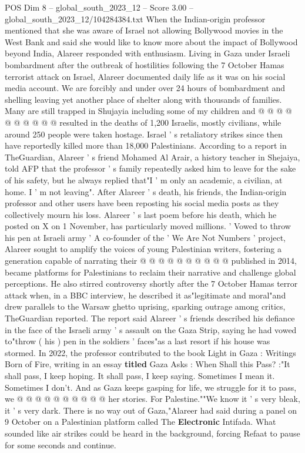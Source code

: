 \begin{textsample}{POS Dim 8 – global\_south\_2023\_12 – Score 3.00 – global\_south\_2023\_12/104284384.txt}
When the Indian-origin professor mentioned that she was aware of Israel not allowing Bollywood movies in the West Bank and said she would like to know more about the impact of Bollywood beyond India, Alareer responded with enthusiasm.
Living in Gaza under Israeli bombardment after the outbreak of hostilities following the 7 October Hamas terrorist attack on Israel, Alareer documented daily life as it was on his social media account.
We are forcibly and under over 24 hours of bombardment and shelling leaving yet another place of shelter along with thousands of families.
Many are still trapped in Shujayia including some of my children and @ @ @ @ @ @ @ @ @ @ resulted in the deaths of 1,200 Israelis, mostly civilians, while around 250 people were taken hostage.
Israel ' s retaliatory strikes since then have reportedly killed more than 18,000 Palestinians.
According to a report in TheGuardian, Alareer ' s friend Mohamed Al Arair, a history teacher in Shejaiya, told AFP that the professor ' s family repeatedly asked him to leave for the sake of his safety, but he always replied that"I ' m only an academic, a civilian, at home.
I ' m not leaving".
After Alareer ' s death, his friends, the Indian-origin professor and other users have been reposting his social media posts as they collectively mourn his loss.
Alareer ' s last poem before his death, which he posted on X on 1 November, has particularly moved millions. ' Vowed to throw his pen at Israeli army ' A co-founder of the ' We Are Not Numbers ' project, Alareer sought to amplify the voices of young Palestinian writers, fostering a generation capable of narrating their @ @ @ @ @ @ @ @ @ @ published in 2014, became platforms for Palestinians to reclaim their narrative and challenge global perceptions.
He also stirred controversy shortly after the 7 October Hamas terror attack when, in a BBC interview, he described it as"legitimate and moral"and drew parallels to the Warsaw ghetto uprising, sparking outrage among critics, TheGuardian reported.
The report said Alareer ' s friends described his defiance in the face of the Israeli army ' s assault on the Gaza Strip, saying he had vowed to"throw ( his ) pen in the soldiers ' faces"as a last resort if his house was stormed.
In 2022, the professor contributed to the book Light in Gaza : Writings Born of Fire, writing in an essay \textbf{titled} Gaza Asks : When Shall this Pass? :"It shall pass, I keep hoping.
It shall pass, I keep saying.
Sometimes I mean it.
Sometimes I don't.
And as Gaza keeps gasping for life, we struggle for it to pass, we @ @ @ @ @ @ @ @ @ @ her stories.
For Palestine.""We know it ' s very bleak, it ' s very dark.
There is no way out of Gaza,"Alareer had said during a panel on 9 October on a Palestinian platform called The \textbf{Electronic} Intifada.
What sounded like air strikes could be heard in the background, forcing Refaat to pause for some seconds and continue.

\end{textsample}
